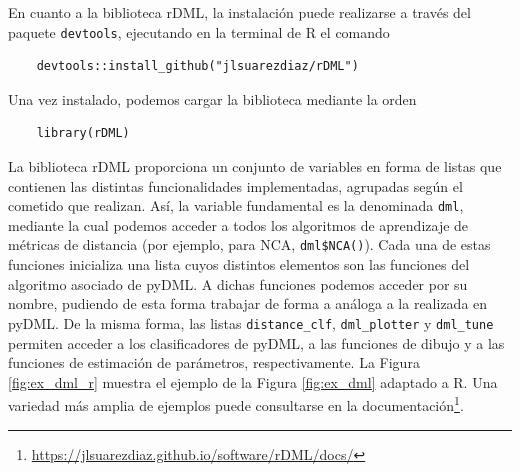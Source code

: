 En cuanto a la biblioteca rDML, la instalación puede realizarse a través del paquete \texttt{devtools}, ejecutando en la terminal de R el comando
\begin{verbatim}
    devtools::install_github("jlsuarezdiaz/rDML")
\end{verbatim}
Una vez instalado, podemos cargar la biblioteca mediante la orden
\begin{verbatim}
    library(rDML)
\end{verbatim}
La biblioteca rDML proporciona un conjunto de variables en forma de listas que contienen las distintas funcionalidades implementadas, agrupadas según el cometido que realizan. Así, la variable fundamental es la denominada \texttt{dml}, mediante la cual podemos acceder a todos los algoritmos de aprendizaje de métricas de distancia (por ejemplo, para NCA, \texttt{dml\$NCA()}). Cada una de estas funciones inicializa una lista cuyos distintos elementos son las funciones del algoritmo asociado de pyDML. A dichas funciones podemos acceder por su nombre, pudiendo de esta forma trabajar de forma a análoga a la realizada en pyDML. De la misma forma, las listas \texttt{distance\_clf}, \texttt{dml\_plotter} y \texttt{dml\_tune} permiten acceder a los clasificadores de pyDML, a las funciones de dibujo y a las funciones de estimación de parámetros, respectivamente. La Figura \ref{fig:ex_dml_r} muestra el ejemplo de la Figura \ref{fig:ex_dml} adaptado a R. Una variedad más amplia de ejemplos puede consultarse en la documentación\footnote{\url{https://jlsuarezdiaz.github.io/software/rDML/docs/}}.
